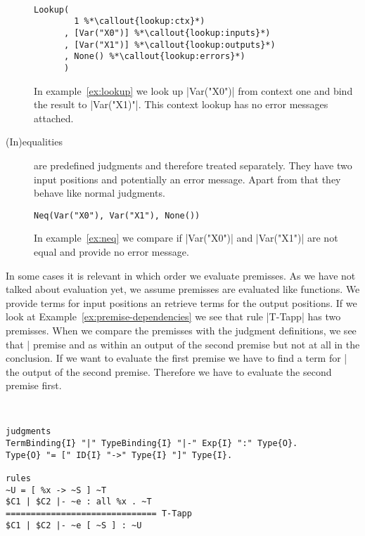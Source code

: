 \begin{description}
\begin{example}{~}
\begin{lstlisting}[language=sltc]
Lookup(
        1 %*\callout{lookup:ctx}*)
      , [Var("X0")] %*\callout{lookup:inputs}*)
      , [Var("X1")] %*\callout{lookup:outputs}*)
      , None() %*\callout{lookup:errors}*)
      )
\end{lstlisting}
\label{ex:lookup}
\end{example}

  In example~\ref{ex:lookup} we look up \code|Var("X0")| from
  context one and bind the result to \code|Var("X1)"|. This context
  lookup has no error messages attached.

\item[(In)equalities] are predefined judgments and therefore treated
  separately. They have two input positions and potentially an error
  message. Apart from that they behave like normal judgments.

\begin{example}
\begin{lstlisting}[language=sltc]
Neq(Var("X0"), Var("X1"), None())
\end{lstlisting}
\label{ex:neq}
\end{example}

  In example~\ref{ex:neq} we compare if \code|Var("X0")| and
  \code|Var("X1")| are not equal and provide no error message.
\end{description}

In some cases it is relevant in which order we evaluate premisses. As
we have not talked about evaluation yet, we assume premisses are
evaluated like functions. We provide terms for input positions an
retrieve terms for the output positions. If we look at
Example~\ref{ex:premise-dependencies} we see that rule \code|T-Tapp|
has two premisses. When we compare the premisses with the judgment
definitions, we see that \code|%
premise and as within an output of the second premise but not at all
in the conclusion. If we want to evaluate the first premise we have to
find a term for \code|%
the output of the second premise. Therefore we have to evaluate the
second premise first.

\begin{example}{~}
\begin{lstlisting}[language=sltc]
judgments
TermBinding{I} "|" TypeBinding{I} "|-" Exp{I} ":" Type{O}.
Type{O} "= [" ID{I} "->" Type{I} "]" Type{I}.

rules
~U = [ %x -> ~S ] ~T
$C1 | $C2 |- ~e : all %x . ~T 
============================== T-Tapp
$C1 | $C2 |- ~e [ ~S ] : ~U
\end{lstlisting}
\label{ex:premise-dependencies}
\end{example}

